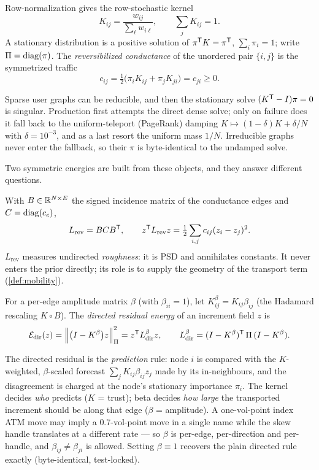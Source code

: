 \documentclass[11pt]{article}
\newcommand{\Kbeta}{K^{\beta}}
\newcommand{\Ldir}{L_{\mathrm{dir}}}
\newcommand{\Lrev}{L_{\mathrm{rev}}}
\begin{document}
\begin{definition}
\label{def:kernel}
Row-normalization gives the row-stochastic kernel
\[
K_{ij}=\frac{w_{ij}}{\sum_\ell w_{i\ell}},\qquad \sum_j K_{ij}=1 .
\]
A stationary distribution is a positive solution of $\pi^{\mathsf{T}} K=\pi^{\mathsf{T}}$,
$\sum_i\pi_i=1$; write $\Pi=\operatorname{diag}(\pi)$. The \emph{reversibilized conductance}
of the unordered pair $\{i,j\}$ is the symmetrized traffic
\[
c_{ij}=\tfrac12\big(\pi_iK_{ij}+\pi_jK_{ji}\big)=c_{ji}\ge0 .
\]
\end{definition}

\begin{remark}
\label{rem:reducible}
Sparse user graphs can be reducible, and then the stationary solve
$(K^{\mathsf{T}}-I)\pi=0$ is singular. Production first attempts the direct dense solve;
only on failure does it fall back to the uniform-teleport (PageRank) damping
$K\mapsto(1-\delta)K+\delta/N$ with $\delta=10^{-3}$, and as a last resort the
uniform mass $1/N$. Irreducible graphs never enter the fallback, so their
$\pi$ is byte-identical to the undamped solve.
\end{remark}

Two symmetric energies are built from these objects, and they answer different
questions.

\begin{definition}
\label{def:lrev}
With $B\in\mathbb{R}^{N\times E}$ the signed incidence matrix of the conductance edges
and $C=\operatorname{diag}(c_e)$,
\[
\Lrev=BCB\T,\qquad
z\T\Lrev z=\tfrac12\sum_{i,j}c_{ij}(z_i-z_j)^2 .
\]
$\Lrev$ measures undirected \emph{roughness}: it is PSD and annihilates
constants. It never enters the prior directly; its role is to supply the
geometry of the transport term (\cref{def:mobility}).
\end{definition}

\begin{definition}
\label{def:ldir}
For a per-edge amplitude matrix $\beta$ (with $\beta_{ii}=1$), let
$\Kbeta_{ij}=K_{ij}\beta_{ij}$ (the Hadamard rescaling $K\!\circ\!B$). The
\emph{directed residual energy} of an increment field $z$ is
\[
\mathcal E_{\mathrm{dir}}(z)
=\norm[\Big]{\big(I-\Kbeta\big)z}_{\Pi}^2
=z\T\Ldir^{\beta}z,
\qquad
\Ldir^{\beta}=(I-\Kbeta)\T\,\Pi\,(I-\Kbeta).
\]
\end{definition}

The directed residual is the \emph{prediction} rule: node $i$ is compared with
the $K$-weighted, $\beta$-scaled forecast $\sum_jK_{ij}\beta_{ij}z_j$ made by
its in-neighbours, and the disagreement is charged at the node's stationary
importance $\pi_i$. The kernel decides \emph{who} predicts ($K$ = trust); beta
decides \emph{how large} the transported increment should be along that edge
($\beta$ = amplitude). A one-vol-point index ATM move may imply a
$0.7$-vol-point move in a single name while the skew handle translates at a
different rate --- so $\beta$ is per-edge, per-direction and per-handle, and
$\beta_{ij}\neq\beta_{ji}$ is allowed. Setting $\beta\equiv1$ recovers the plain
directed rule exactly (byte-identical, test-locked).
\end{document}

